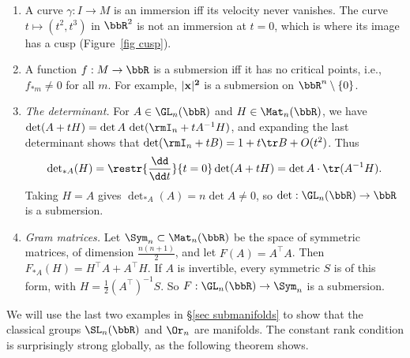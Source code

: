 \begin{example}\label{example rank}
    \begin{enumerate}
        \item A curve $\gamma:I\to M$ is an immersion iff its velocity never vanishes. The curve $t\mapsto(t^2,t^3)$ in $\bbR^2$ is not an immersion at $t=0$, which is where its image has a cusp (Figure~\ref{fig cusp}).
        \item A function $f:M\to\bbR$ is a submersion iff it has no critical points, i.e., $f_{\ast m}\neq0$ for all $m$. For example, $\lvert\bf{x}\rvert^2$ is a submersion on $\bbR^n\setminus\{0\}$.
        \item \emph{The determinant.} For $A\in\GL_n(\bbR)$ and $H\in\Mat_n(\bbR)$, we have $\det(A+tH)=\det A\,\det(\rmI_n+tA^{-1}H)$, and expanding the last determinant shows that $\det(\rmI_n+tB)=1+t\tr B+O(t^2)$. Thus
        \[\det\nolimits_{\ast A}(H)=\restr{\frac{\dd}{\dd t}}{t=0}\det(A+tH)=\det A\cdot\tr(A^{-1}H).\]
        Taking $H=A$ gives $\det\nolimits_{\ast A}(A)=n\det A\neq0$, so $\det:\GL_n(\bbR)\to\bbR$ is a submersion.
        \item \emph{Gram matrices.} Let $\Sym_n\subset\Mat_n(\bbR)$ be the space of symmetric matrices, of dimension $\frac{n(n+1)}2$, and let $F(A)=A^\top A$. Then $F_{\ast A}(H)=H^\top A+A^\top H$. If $A$ is invertible, every symmetric $S$ is of this form, with $H=\frac12(A^\top)^{-1}S$. So $F:\GL_n(\bbR)\to\Sym_n$ is a submersion.
    \end{enumerate}
\end{example}
We will use the last two examples in \S\ref{sec submanifolds} to show that the classical groups $\SL_n(\bbR)$ and $\Or_n$ are manifolds. The constant rank condition is surprisingly strong globally, as the following theorem shows.

